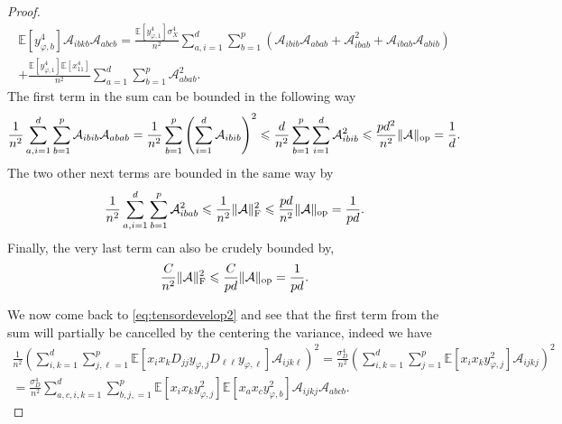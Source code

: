 \documentclass[letterpaper, 10pt, dvipsnames]{article}
\numberwithin{equation}{section}
\renewcommand{\phi}{\varphi}
\let\O\relax
\newcommand{\O}[1]{\mathcal{O}\left(#1\right)}
\newcommand{\E}{\mathds{E}}
\theoremstyle{definition}
\begin{document}
\begin{proof}
\begin{multline*}
  \E\left[
    y_{\phi,b}^4
  \right]\mathcal{A}_{ibkb}\mathcal{A}_{abcb}
  =
  \frac{\E\left[y_{\phi,1}^4\right]\sigma_X^4}{n^2}
  \sum_{a,i=1}^d \sum_{b=1}^p \left(
  \mathcal{A}_{ibib}\mathcal{A}_{abab}+\mathcal{A}_{ibab}^2+\mathcal{A}_{ibab}\mathcal{A}_{abib}
  \right)
  \\
  +
  \frac{\E\left[y_{\phi,1}^4\right]\E\left[x_{11}^4\right]}
  {n^2}\sum_{a=1}^d\sum_{b=1}^p \mathcal{A}_{abab}^2.
  \end{multline*}
  The first term in the sum can be bounded in the following way 
  \[
  \frac{1}{n^2}\sum_{a,i=1}^d \sum_{b=1}^p \mathcal{A}_{ibib}\mathcal{A}_{abab}
  =
  \frac{1}{n^2}\sum_{b=1}^p \left(
    \sum_{i=1}^d \mathcal{A}_{ibib}
  \right)^2
  \leqslant \frac{d}{n^2}\sum_{b=1}^p 
  \sum_{i=1}^d \mathcal{A}_{ibib}^2
  \leqslant \frac{pd^2}{n^2}\Vert \mathcal{A}\Vert_{\mathrm{op}}=\O{\frac{1}{d}}.
  \]
  The two other next terms are bounded in the same way by 
  \[
  \frac{1}{n^2}\sum_{a,i=1}^d \sum_{b=1}^p \mathcal{A}_{ibab}^2 \leqslant \frac{1}{n^2}\Vert \mathcal{A}\Vert_{\mathrm{F}}^2 \leqslant\frac{pd}{n^2}\Vert \mathcal{A}\Vert_{\mathrm{op}}=\O{\frac{1}{pd}}.   
  \]
  Finally, the very last term can also be crudely bounded by, 
  \[
  \frac{C}{n^2} \Vert \mathcal{A}\Vert_{\mathrm{F}}^2 \leqslant\frac{C}{pd}\Vert \mathcal{A}\Vert_{\mathrm{op}}=\O{\frac{1}{pd}}. 
  \]

  We now come back to \eqref{eq:tensordevelop2} and see that the first term from the sum will partially be cancelled by the centering the variance, indeed we have 
  \begin{multline}\label{eq:tensorexpect}
  \frac{1}{n^2}
  \left(
    \sum_{i,k=1}^d \sum_{j,\ell=1}^p 
    \E\left[
      x_{i}x_kD_{jj}y_{\phi,j}D_{\ell\ell}y_{\phi,\ell}
    \right]
    \mathcal{A}_{ijk\ell}
  \right)^2
  =
  \frac{\sigma_D^4}{n^2}
  \left(
    \sum_{i,k=1}^d 
    \sum_{j=1}^p
    \E\left[
      x_ix_ky_{\phi,j}^2
    \right]
    \mathcal{A}_{ijkj}
  \right)^2 
  \\
  =
  \frac{\sigma_D^4}{n^2}
  \sum_{a,c,i,k=1}^d
  \sum_{b,j,=1}^p
  \E\left[
    x_ix_ky_{\phi,j}^2
  \right]
  \E\left[
    x_ax_cy_{\phi,b}^2
  \right]
  \mathcal{A}_{ijkj}\mathcal{A}_{abcb}.
\end{multline}


\end{proof}
\end{document}
